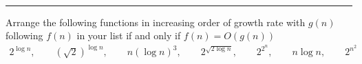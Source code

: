 \documentclass[a4paper, 12pt]{article}
\title{\course \; \assignmentName}
\author{\textbf{\assignmentAuthor} \\ \Small{USC ID - \USCID}}
\date{\assignmentDate}
\begin{document}
\thispagestyle{plain}
\maketitle
\hrule
\bigskip


\begin{question}[1]
Arrange the following functions in increasing order of growth rate with $g(n)$ following
\(f(n)\) in your list if and only if \(f(n) = O(g(n))\)
\bigskip
\begin{align*}
    2^{\log n},\hspace{2em}
    (\sqrt{2})^{\log n},\hspace{2em}
    n (\log n)^3,\hspace{2em}
    2^{\sqrt{2 \log n}},\hspace{2em}
    2^{2^n},\hspace{2em}
    n \log n,\hspace{2em}
    2^{n^2}
\end{align*}
\smallskip
\end{question}
\end{document}
